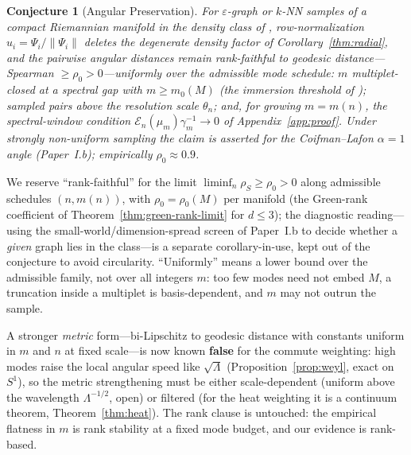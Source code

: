 \documentclass[11pt]{article}
\newtheorem{conjecture}[theorem]{Conjecture}
\theoremstyle{remark}
\begin{document}
\begin{conjecture}[Angular Preservation]\label{conj:angle}
For $\varepsilon$-graph or $k$-NN samples of a compact Riemannian manifold in the
density class of \cite{garciatrillos2018,calder2022}, row-normalization
$\hat u_i=\Psi_i/\lVert\Psi_i\rVert$ deletes the degenerate density factor of
Corollary~\ref{thm:radial}, and the pairwise angular distances remain
\emph{rank-faithful} to geodesic distance---Spearman $\ge\rho_0>0$---uniformly over
the admissible mode schedule: $m$ multiplet-closed at a spectral gap with
$m\ge m_0(M)$ (the immersion threshold of \cite{bates2014,portegies2016}); sampled
pairs above the resolution scale $\theta_n$; and, for growing $m=m(n)$, the
spectral-window condition $\mathcal E_n(\mu_m)\gamma_m^{-1}\to0$ of
Appendix~\ref{app:proof}. Under strongly non-uniform sampling the claim is asserted
for the Coifman--Lafon $\alpha{=}1$ angle (Paper~I.b); empirically
$\rho_0\approx0.9$.
\end{conjecture}

We reserve ``rank-faithful'' for the limit $\liminf_{n}\rho_S\ge\rho_0>0$ along
admissible schedules $(n,m(n))$, with $\rho_0=\rho_0(M)$ per manifold (the
Green-rank coefficient of Theorem~\ref{thm:green-rank-limit} for $d\le3$); the
diagnostic reading---using the small-world/dimension-spread screen of Paper~I.b to
decide whether a \emph{given} graph lies in the class---is a separate
corollary-in-use, kept out of the conjecture to avoid circularity. ``Uniformly''
means a lower bound over the admissible family, not over all integers $m$: too few
modes need not embed $M$, a truncation inside a multiplet is basis-dependent, and
$m$ may not outrun the sample.

A stronger \emph{metric} form---bi-Lipschitz to geodesic distance with constants
uniform in $m$ and $n$ at fixed scale---is now known \textbf{false} for the commute
weighting: high modes raise the local angular speed like $\sqrt\Lambda$
(Proposition~\ref{prop:weyl}, exact on $S^1$), so the metric strengthening must be
either scale-dependent (uniform above the wavelength $\Lambda^{-1/2}$, open) or
filtered (for the heat weighting it is a continuum theorem,
Theorem~\ref{thm:heat}). The rank clause is untouched: the empirical flatness in
$m$ is rank stability at a fixed mode budget, and our evidence is rank-based.
\end{document}
